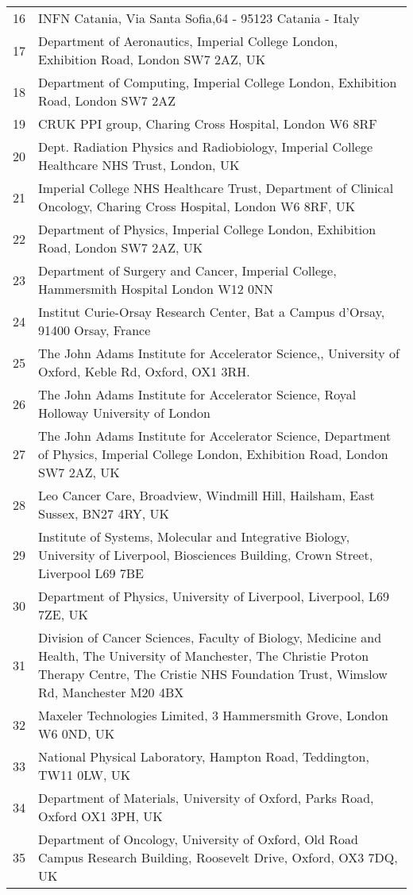 {\begin{tabular}{ c p{15cm} }
     16 & INFN Catania, Via Santa Sofia,64 - 95123 Catania - Italy\\
     17 & Department of Aeronautics, Imperial College London, Exhibition Road, London SW7 2AZ, UK\\
     18 & Department of Computing, Imperial College London, Exhibition Road, London SW7 2AZ\\
     19 & CRUK PPI group, Charing Cross Hospital, London W6 8RF\\
     20 & Dept. Radiation Physics and Radiobiology, Imperial College Healthcare NHS Trust, London, UK\\
     21 & Imperial College NHS Healthcare Trust, Department of Clinical Oncology, Charing Cross Hospital, London W6 8RF, UK\\
     22 & Department of Physics, Imperial College London, Exhibition Road, London SW7 2AZ, UK\\
     23 & Department of Surgery and Cancer, Imperial College, Hammersmith Hospital London W12 0NN\\
     24 & Institut Curie-Orsay Research Center, Bat a Campus d'Orsay, 91400 Orsay, France\\
     25 & The John Adams Institute for Accelerator Science,, University of Oxford, Keble Rd, Oxford, OX1 3RH.\\
     26 & The John Adams Institute for Accelerator Science, Royal Holloway University of London\\
     27 & The John Adams Institute for Accelerator Science, Department of Physics, Imperial College London, Exhibition Road, London SW7 2AZ, UK\\
     28 & Leo Cancer Care, Broadview, Windmill Hill, Hailsham, East Sussex, BN27 4RY, UK\\
     29 & Institute of Systems, Molecular and Integrative Biology, University of Liverpool, Biosciences Building, Crown Street, Liverpool L69 7BE\\
     30 & Department of Physics, University of Liverpool, Liverpool, L69 7ZE, UK\\
     31 & Division of Cancer Sciences, Faculty of Biology, Medicine and Health, The University of Manchester, The Christie Proton Therapy Centre, The Cristie NHS Foundation Trust, Wimslow Rd, Manchester M20 4BX\\
     32 & Maxeler Technologies Limited, 3 Hammersmith Grove, London W6 0ND, UK\\
     33 & National Physical Laboratory, Hampton Road, Teddington, TW11 0LW, UK\\
     34 & Department of Materials, University of Oxford, Parks Road, Oxford OX1 3PH, UK\\
     35 & Department of Oncology, University of Oxford, Old Road Campus Research Building, Roosevelt Drive, Oxford, OX3 7DQ, UK\\
  \end{tabular}
}
 
